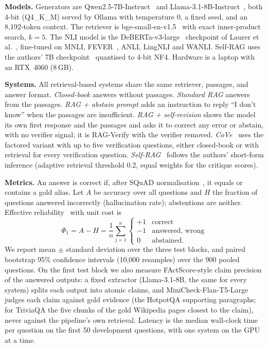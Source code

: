 \documentclass[conference]{IEEEtran}
\begin{document}
\textbf{Models.} Generators are Qwen2.5-7B-Instruct~\cite{qwen2024qwen25} and Llama-3.1-8B-Instruct~\cite{dubey2024llama3}, both 4-bit (Q4\_K\_M) served by Ollama with temperature 0, a fixed seed, and an 8{,}192-token context. The retriever is bge-small-en-v1.5~\cite{xiao2023cpack} with exact inner-product search, $k=5$. The NLI model is the DeBERTa-v3-large~\cite{he2021debertav3} checkpoint of Laurer et al.~\cite{laurer2023nli}, fine-tuned on MNLI, FEVER~\cite{thorne2018fever}, ANLI, LingNLI and WANLI. Self-RAG uses the authors' 7B checkpoint~\cite{asai2023selfrag} quantised to 4-bit NF4. Hardware is a laptop with an RTX~4060 (8\,GB).

\textbf{Systems.} All retrieval-based systems share the same retriever, passages, and answer format. \emph{Closed-book} answers without passages. \emph{Standard RAG} answers from the passages. \emph{RAG + abstain prompt} adds an instruction to reply ``I don't know'' when the passages are insufficient. \emph{RAG + self-revision} shows the model its own first response and the passages and asks it to correct any error or abstain, with no verifier signal; it is RAG-Verify with the verifier removed. \emph{CoVe}~\cite{dhuliawala2023cove} uses the factored variant with up to five verification questions, either closed-book or with retrieval for every verification question. \emph{Self-RAG}~\cite{asai2023selfrag} follows the authors' short-form inference (adaptive retrieval threshold 0.2, equal weights for the critique scores).

\textbf{Metrics.} An answer is correct if, after SQuAD normalisation~\cite{rajpurkar2016squad}, it equals or contains a gold alias. Let $A$ be accuracy over all questions and $H$ the fraction of questions answered incorrectly (hallucination rate); abstentions are neither. Effective reliability~\cite{whitehead2022reliable} with unit cost is
\begin{equation}
\Phi_1 = A - H = \frac{1}{n}\sum_{j=1}^{n}\begin{cases}+1 & \text{correct}\\ -1 & \text{answered, wrong}\\ 0 & \text{abstained.}\end{cases}
\end{equation}
We report mean $\pm$ standard deviation over the three test blocks, and paired bootstrap 95\% confidence intervals (10{,}000 resamples) over the 900 pooled questions. On the first test block we also measure FActScore-style claim precision of the answered outputs: a fixed extractor (Llama-3.1-8B, the same for every system) splits each output into atomic claims, and MiniCheck-Flan-T5-Large~\cite{tang2024minicheck} judges each claim against gold evidence (the HotpotQA supporting paragraphs; for TriviaQA the five chunks of the gold Wikipedia pages closest to the claim), never against the pipeline's own retrieval. Latency is the median wall-clock time per question on the first 50 development questions, with one system on the GPU at a time.
\end{document}
